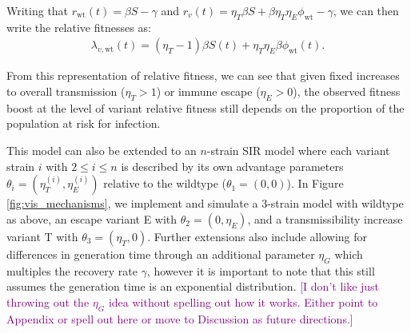 \documentclass[12pt,oneside,letterpaper]{article}
\newcommand{\wt}{\text{wt}}
\def\tbc#1{\textcolor{purple}{[#1]}}
\begin{document}
Writing that $r_{\wt}(t) = \beta S - \gamma$ and $r_{v}(t) = \eta_{T} \beta  S + \beta \eta_{T} \eta_{E} \phi_{\wt} - \gamma$, we can then write the relative fitnesses as:
\begin{align*}
\lambda_{v,\wt}(t) = (\eta_{T} - 1)\beta S(t) + \eta_{T} \eta_{E} \beta \phi_{\wt}(t).
\end{align*}

From this representation of relative fitness, we can see that given fixed increases to overall transmission ($\eta_{T} > 1$) or immune escape ($\eta_{E} > 0$), the observed fitness boost at the level of variant relative fitness still depends on the proportion of the population at risk for infection.

This model can also be extended to an $n$-strain SIR model where each variant strain $i$ with $2\leq i \leq n$ is described by its own advantage parameters $\theta_{i} = (\eta_{T}^{(i)},\eta_{E}^{(i)})$  relative to the wildtype ($\theta_{1} = (0, 0)$).
In Figure \ref{fig:vis_mechanisms}, we implement and simulate a 3-strain model with wildtype as above, an escape variant E with $\theta_{2} = (0, \eta_{E})$, and a transmissibility increase variant T with $\theta_{3} = (\eta_{T}, 0)$.
Further extensions also include allowing for differences in generation time through an additional parameter $\eta_{G}$ which multiples the recovery rate $\gamma$, however it is important to note that this still assumes the generation time is an exponential distribution.
\tbc{I don't like just throwing out the $\eta_{G}$ idea without spelling out how it works. Either point to Appendix or spell out here or move to Discussion as future directions.}
\end{document}
